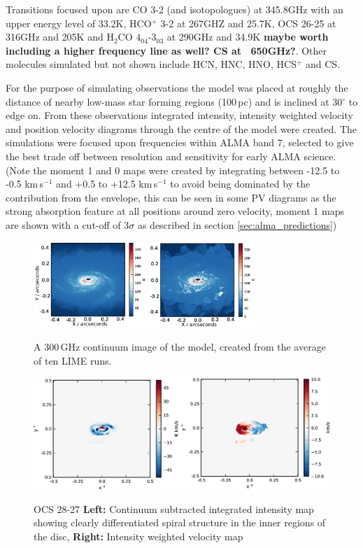 \documentclass[useAMS,usenatbib]{mn2e}
\begin{document}
Transitions focused upon are CO 3-2 (and isotopologues) at 345.8GHz with an upper energy level of 33.2K, HCO$^+$ 3-2 at 267GHZ and 25.7K, OCS 26-25 at 316GHz and 205K and H$_2$CO $4_{04}$-3$_{03}$ at 290GHz and 34.9K {\bf maybe worth including a higher frequency line as well? CS at ~650GHz?}. Other molecules simulated but not shown include HCN, HNC, HNO, HCS$^+$ and CS.\newline

For the purpose of simulating observations the model was placed at roughly the distance of nearby low-mass star forming regions (100$\,$pc) and is inclined at 30$^\circ$ to edge on. From these observations integrated intensity, intensity weighted velocity and position velocity diagrams through the centre of the model were created.
The simulations were focused upon frequencies within ALMA band 7, selected to give the best trade off between resolution and sensitivity for early ALMA science.
(Note the moment 1 and 0 maps were created by integrating between -12.5 to -0.5 km$\,$s$^{-1}$ and +0.5 to +12.5 km$\,$s$^{-1}$ to avoid being dominated by the contribution from the envelope, this can be seen in some PV diagrams as the strong absorption feature at all positions around zero velocity, moment 1 maps are shown with a cut-off of 3$\sigma$ as described in section \ref{sec:alma_predictions})\newline

\begin{figure}
 \includegraphics[width=84mm]{Figures/sim/continuum.eps}
 \label{points}
 \caption{A 300$\,$GHz continuum image of the model, created from the average of ten LIME runs.}
\end{figure}

\begin{figure}
 \includegraphics[width=168mm]{Figures/sim/imageOCS_28-27_30deg_composite_all.eps}
 \label{OCS_all}
 \caption{OCS 28-27 {\bf Left:} Continuum subtracted integrated intensity map showing clearly differentiated spiral structure in the inner regions of the disc, {\bf Right:} Intensity weighted velocity map}
\end{figure}
\end{document}
